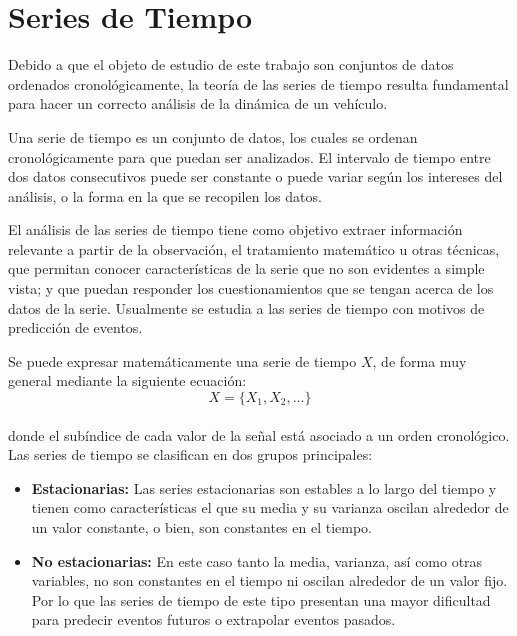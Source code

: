 \section{Series de Tiempo}

Debido a que el objeto de estudio de este trabajo son conjuntos de datos ordenados cronológicamente, la teoría de las series de tiempo resulta fundamental para hacer un correcto análisis de la dinámica de un vehículo.

Una serie de tiempo es un conjunto de datos, los cuales se ordenan cronológicamente para que puedan ser analizados. 
El intervalo de tiempo entre dos datos consecutivos puede ser constante o puede variar según los intereses del análisis, o la forma en la que se recopilen los datos. 

El análisis de las series de tiempo tiene como objetivo extraer información relevante a partir de la observación, el tratamiento matemático u otras técnicas, que permitan conocer características de la serie que no son evidentes a simple vista; y que puedan responder los cuestionamientos que se tengan acerca de los datos de la serie.
Usualmente se estudia a las series de tiempo con motivos de predicción de eventos.

Se puede expresar matemáticamente una serie de tiempo $X$, de forma muy general mediante la siguiente ecuación:\\

$$X=\{X_{1}, X_{2},\ldots\}$$\\

\noindent donde el subíndice de cada valor de la señal está asociado a un orden cronológico.\\

Las series de tiempo se clasifican en dos grupos principales:

\begin{itemize}
\item {\bf Estacionarias:} Las series estacionarias son estables a lo largo del tiempo y tienen como características el que su media y su varianza oscilan alrededor de un valor constante, o bien, son constantes en el tiempo.

\item {\bf No estacionarias:} En este caso tanto la media, varianza, así como otras variables, no son constantes en el tiempo ni oscilan alrededor de un valor fijo. 
Por lo que las series de tiempo de este tipo presentan una mayor dificultad para predecir eventos futuros o extrapolar eventos pasados.
\end{itemize}

